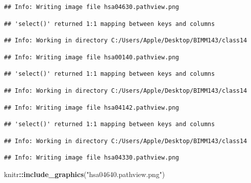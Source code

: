 \documentclass[
]{article}
\newenvironment{Shaded}{\begin{snugshade}}{\end{snugshade}}
\newcommand{\FunctionTok}[1]{\textcolor[rgb]{0.13,0.29,0.53}{\textbf{#1}}}
\newcommand{\NormalTok}[1]{#1}
\newcommand{\SpecialCharTok}[1]{\textcolor[rgb]{0.81,0.36,0.00}{\textbf{#1}}}
\newcommand{\StringTok}[1]{\textcolor[rgb]{0.31,0.60,0.02}{#1}}
\begin{document}
\begin{verbatim}
## Info: Writing image file hsa04630.pathview.png
\end{verbatim}

\begin{verbatim}
## 'select()' returned 1:1 mapping between keys and columns
\end{verbatim}

\begin{verbatim}
## Info: Working in directory C:/Users/Apple/Desktop/BIMM143/class14
\end{verbatim}

\begin{verbatim}
## Info: Writing image file hsa00140.pathview.png
\end{verbatim}

\begin{verbatim}
## 'select()' returned 1:1 mapping between keys and columns
\end{verbatim}

\begin{verbatim}
## Info: Working in directory C:/Users/Apple/Desktop/BIMM143/class14
\end{verbatim}

\begin{verbatim}
## Info: Writing image file hsa04142.pathview.png
\end{verbatim}

\begin{verbatim}
## 'select()' returned 1:1 mapping between keys and columns
\end{verbatim}

\begin{verbatim}
## Info: Working in directory C:/Users/Apple/Desktop/BIMM143/class14
\end{verbatim}

\begin{verbatim}
## Info: Writing image file hsa04330.pathview.png
\end{verbatim}

\begin{Shaded}
\begin{Highlighting}[]
\NormalTok{knitr}\SpecialCharTok{::}\FunctionTok{include\_graphics}\NormalTok{(}\StringTok{"hsa04640.pathview.png"}\NormalTok{)}
\end{Highlighting}
\end{Shaded}
\end{document}
